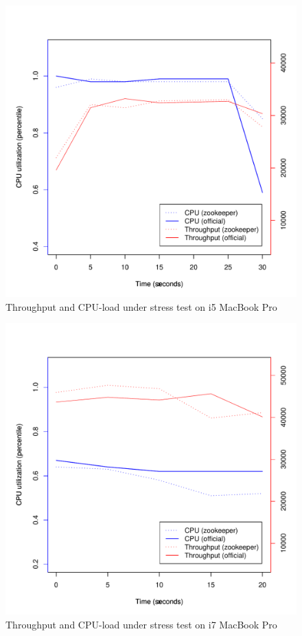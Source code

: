 \begin{figure}[h]
    \centering
    \includegraphics[width=1.0\textwidth]{results/throughput/singlenode/throughput_knut}
    \caption{Throughput and CPU-load under stress test on i5 MacBook Pro}
    \label{fig:thug_knut}
\end{figure}

\clearpage

\begin{figure}[h]
    \centering
    \includegraphics[width=1.0\textwidth]{results/throughput/singlenode/throughput_eivind}
    \caption{Throughput and CPU-load under stress test on i7 MacBook Pro}
    \label{fig:thug_eivind}
\end{figure}



